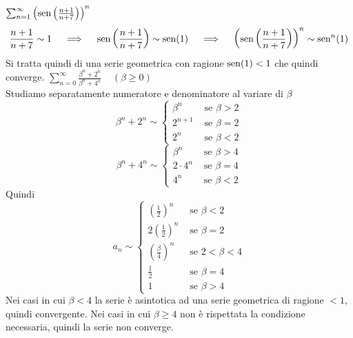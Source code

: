 \documentclass{article}
\newcommand{\se}{\text{ se }}
\begin{document}
\begin{enumerate}[label=\textbf{Esercizio 9.\arabic*.},itemindent=*]
\begin{tasks}
        \task $\sum_{n=1}^\infty\left( \operatorname{sen}\left( \frac{n+1}{n+7} \right) \right)^n$\\
        \[\frac{n+1}{n+7}\sim 1~~~\implies ~~~\operatorname{sen} \left( \frac{n+1}{n+7} \right)\sim \operatorname{sen}(1)~~~\implies~~~\left( \operatorname{sen}\left( \frac{n+1}{n+7} \right) \right)^n\sim \operatorname{sen}^n(1)\]
        Si tratta quindi di una serie geometrica con ragione $\operatorname{sen}(1)<1$ che quindi converge.
        \task $\sum_{n=0}^\infty\frac{\beta^n+2^n}{\beta^n+4^n}~~~~~(\beta\geq0)$\\
        Studiamo separatamente numeratore e denominatore al variare di $\beta$
        \[\beta^n+2^n\sim \begin{cases}
            \beta^n&\se \beta>2\\
            2^{n+1}&\se \beta=2\\
            2^n&\se \beta<2
        \end{cases}\]
        \[\beta^n+4^n\sim \begin{cases}
            \beta^n&\se \beta>4\\
            2\cdot 4^{n}&\se \beta=4\\
            4^n&\se \beta<2
        \end{cases}\]
        Quindi
        \[a_n\sim\begin{cases}
            \left(\frac{1}{2}\right)^n&\se \beta <2\\
            2\left(\frac{1}{2}\right)^n&\se \beta =2\\
            \left(\frac{\beta}{4}\right)^n&\se 2<\beta <4\\
            \frac{1}{2} & \se \beta=4\\
            1&\se \beta>4
        \end{cases}\]
        Nei casi in cui $\beta <4$ la serie è asintotica ad una serie geometrica di ragione $<1$, quindi convergente.
        Nei casi in cui $\beta\geq 4$ non è rispettata la condizione necessaria, quindi la serie non converge.
    \end{tasks}

\end{enumerate}
\end{document}
